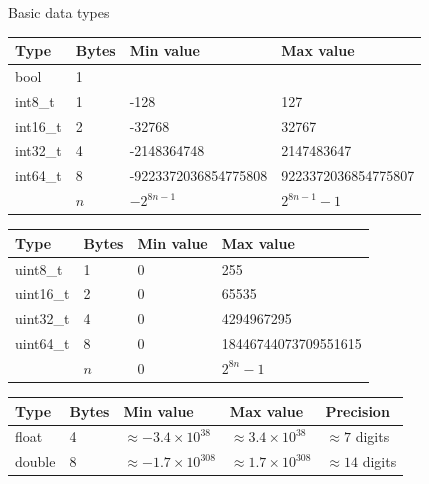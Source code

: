 \documentclass{beamer}
\begin{document}
\begin{frame}[plain]{Basic data types}

    {\scriptsize
        \begin{center}
            \begin{tabular}{l|lll}
                Type & Bytes & Min value & Max value \\
                \hline
                bool & 1 & & \\
                int8\_t & 1 & -128 & 127 \\
                int16\_t & 2 & -32768 & 32767 \\
                int32\_t & 4 & -2148364748 & 2147483647 \\
                int64\_t & 8 & -9223372036854775808 & 9223372036854775807 \\
                          & $n$ & $-2^{8n-1}$ & $2^{8n-1}-1$
            \end{tabular}
        \end{center}
    }

    {\scriptsize
        \begin{center}
            \begin{tabular}{l|lll}
                Type & Bytes & Min value & Max value \\
                \hline
                uint8\_t & 1 & 0 & 255 \\
                uint16\_t & 2 & 0 & 65535 \\
                uint32\_t & 4 & 0 & 4294967295 \\
                uint64\_t & 8 & 0 & 18446744073709551615 \\
                    & $n$ & $0$ & $2^{8n}-1$
            \end{tabular}
        \end{center}
    }

    {\scriptsize
        \begin{center}
            \begin{tabular}{l|llll}
                Type & Bytes & Min value & Max value & Precision \\
                \hline
                float & 4 & $\approx -3.4\times 10^{38}$ & $\approx 3.4\times 10^{38}$ & $\approx 7$ digits \\
                double & 8 & $\approx -1.7\times 10^{308}$ & $\approx 1.7\times 10^{308}$ & $\approx 14$ digits \\
            \end{tabular}
        \end{center}
    }

\end{frame}
\end{document}
